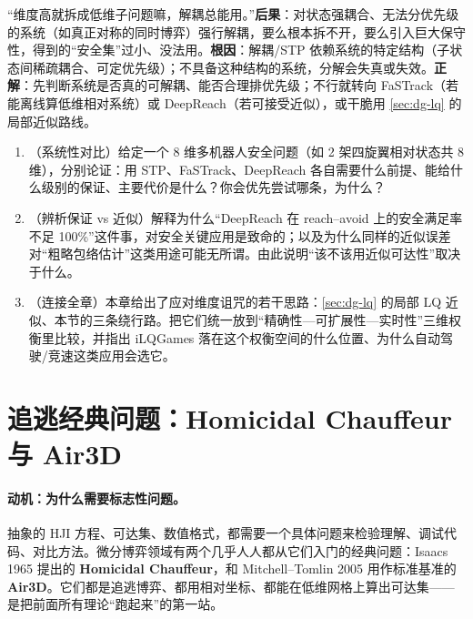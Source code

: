 \begin{pitfall}
“维度高就拆成低维子问题嘛，解耦总能用。”\textbf{后果}：对状态强耦合、无法分优先级的系统（如真正对称的同时博弈）强行解耦，要么根本拆不开，要么引入巨大保守性，得到的“安全集”过小、没法用。\textbf{根因}：解耦/STP 依赖系统的特定结构（子状态间稀疏耦合、可定优先级）；不具备这种结构的系统，分解会失真或失效。\textbf{正解}：先判断系统是否真的可解耦、能否合理排优先级；不行就转向 FaSTrack（若能离线算低维相对系统）或 DeepReach（若可接受近似），或干脆用 \cref{sec:dg-lq} 的局部近似路线。
\end{pitfall}

\begin{practice}
\begin{enumerate}
  \item （系统性对比）给定一个 8 维多机器人安全问题（如 2 架四旋翼相对状态共 8 维），分别论证：用 STP、FaSTrack、DeepReach 各自需要什么前提、能给什么级别的保证、主要代价是什么？你会优先尝试哪条，为什么？
  \item （辨析保证 vs 近似）解释为什么“DeepReach 在 reach--avoid 上的安全满足率不足 100\%”这件事，对安全关键应用是致命的；以及为什么同样的近似误差对“粗略包络估计”这类用途可能无所谓。由此说明“该不该用近似可达性”取决于什么。
  \item （连接全章）本章给出了应对维度诅咒的若干思路：\cref{sec:dg-lq} 的局部 LQ 近似、本节的三条绕行路。把它们统一放到“精确性—可扩展性—实时性”三维权衡里比较，并指出 iLQGames 落在这个权衡空间的什么位置、为什么自动驾驶/竞速这类应用会选它。
\end{enumerate}
\end{practice}

\section{追逃经典问题：Homicidal Chauffeur 与 Air3D}
\label{sec:dg-chase}

\paragraph{动机：为什么需要标志性问题。}
抽象的 HJI 方程、可达集、数值格式，都需要一个具体问题来检验理解、调试代码、对比方法。微分博弈领域有两个几乎人人都从它们入门的经典问题：Isaacs 1965 提出的 \textbf{Homicidal Chauffeur}\cite{isaacs1965differential}，和 Mitchell--Tomlin 2005 用作标准基准的 \textbf{Air3D}\cite{mitchell2005time}。它们都是追逃博弈、都用相对坐标、都能在低维网格上算出可达集——是把前面所有理论“跑起来”的第一站。

